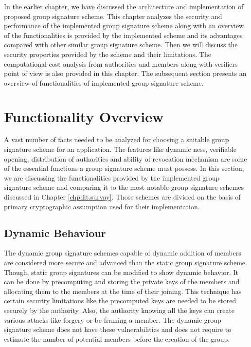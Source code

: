 In the earlier chapter, we have discussed the architecture and implementation of proposed group signature scheme. This chapter analyzes the security and performance of the implemented group signature scheme along with an overview of the functionalities is provided by the implemented scheme and its advantages compared with other similar group signature scheme. Then we will discuss the security properties provided by the scheme and their limitations. The computational cost analysis from authorities and members along with verifiers point of view is also provided in this chapter. The subsequent section presents an overview of functionalities of implemented group signature scheme.

\section{Functionality Overview}
A vast number of facts needed to be analyzed for choosing a suitable group signature scheme for an application. The features like dynamic ness, verifiable opening, distribution of authorities and ability of revocation mechanism are some of the essential functions a group signature scheme must possess. In this section, we are discussing the functionalities provided by the implemented group signature scheme and comparing it to the most notable group signature schemes discussed in Chapter \ref{chp:lit.survay}. Those schemes are divided on the basis of primary cryptographic assumption used for their implementation.

\subsection{Dynamic Behaviour}
The dynamic group signature schemes capable of dynamic addition of members are considered more secure and advanced than the static group signature scheme. Though, static group signatures can be modified to show dynamic behavior. It can be done by precomputing and storing the private keys of the members and allocating them to the members at the time of their joining. This technique has certain security limitations like the precomputed keys are needed to be stored securely by the authority. Also, the authority knowing all the keys can create various attacks like forgery or be framing a member. The dynamic group signature scheme does not have these vulnerabilities and does not require to estimate the number of potential members before the creation of the group.

